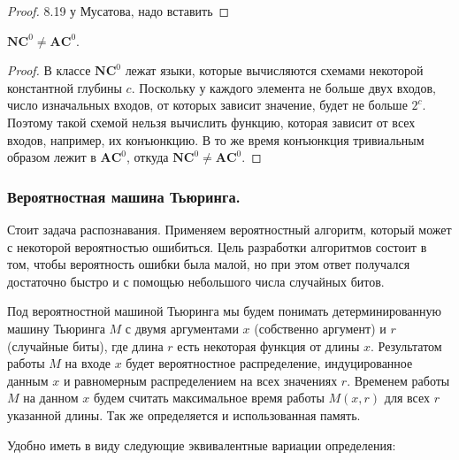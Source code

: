 \begin{proof}
    8.19 у Мусатова, надо вставить %
\end{proof}

\begin{statement}
    $\mathbf{NC}^0 \neq \mathbf{AC}^0$.
\end{statement}

\begin{proof}
    В классе $\mathbf{NC}^0$
лежат языки, которые вычисляются схемами
некоторой константной глубины $c$. Поскольку у каждого элемента не больше
двух входов, число изначальных входов, от которых зависит значение, будет
не больше $2^c$. Поэтому такой схемой нельзя вычислить функцию, которая зависит от всех входов, например, их конъюнкцию. В то же время конъюнкция
тривиальным образом лежит в $\mathbf{AC}^0$, откуда $\mathbf{NC}^0 \neq \mathbf{AC}^0$.
\end{proof}

\subsubsection{Вероятностная машина Тьюринга.}

Стоит задача распознавания. Применяем вероятностный алгоритм, который может
с некоторой вероятностью ошибиться. Цель разработки алгоритмов состоит в
том, чтобы вероятность ошибки была малой, но при этом ответ получался достаточно быстро и с помощью небольшого числа случайных битов. 

\begin{statement}
    Под вероятностной машиной Тьюринга мы будем понимать детерминированную машину Тьюринга $M$ с двумя аргументами $x$ (собственно аргумент) и $r$ (случайные биты), где длина $r$ есть некоторая функция от длины $x$. Результатом работы $M$ на входе $x$ будет вероятностное распределение, индуцированное данным $x$ и равномерным распределением на всех значениях $r$. Временем работы $M$ на данном $x$ будем считать максимальное время работы $M(x, r)$ для всех $r$ указанной длины. Так же определяется и использованная память.
\end{statement}

Удобно иметь в виду следующие эквивалентные вариации определения:

